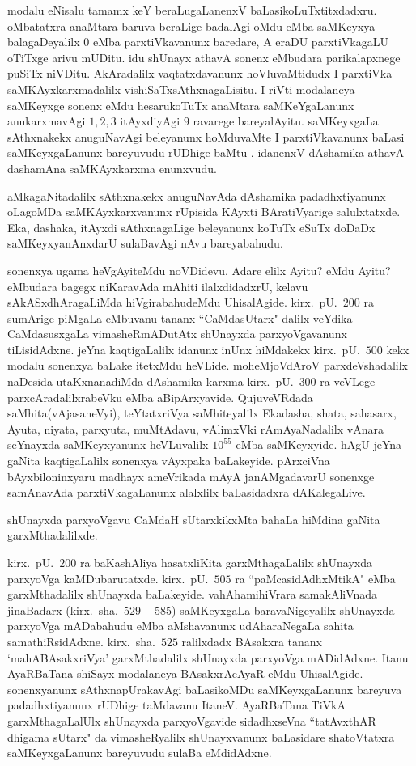modalu eNisalu tamamx keY beraLugaLanenxV baLasikoLuTxtitxdadxru. oMbatatxra anaMtara baruva beraLige badalAgi oMdu eMba saMKeyxya balagaDeyalilx $0$ eMba parxtiVkavanunx baredare, A eraDU parxtiVkagaLU oTiTxge arivu mUDitu. idu shUnayx athavA sonenx eMbudara parikalapxnege puSiTx niVDitu. AkAradalilx vaqtatxdavanunx hoVluvaMtidudx I parxtiVka saMKAyxkarxmadalilx vishiSaTxsAthxnagaLisitu. I riVti modalaneya saMKeyxge sonenx eMdu hesarukoTuTx anaMtara saMKeYgaLanunx anukarxmavAgi $1,2,3$ itAyxdi\-yAgi $9$ ravarege bareyalAyitu. saMKeyxgaLa sAthxnakekx anuguNavAgi beleyanunx hoMdu\-vaMte I parxtiVkavanunx baLasi saMKeyxgaLanunx bareyuvudu rUDhige baMtu . idanenxV dAshamika athavA dashamAna saMKAyxkarxma enunxvudu.

aMkagaNitadalilx sAthxnakekx anuguNavAda dAshamika padadhxtiyanunx oLagoMDa saMKAyx\-karxvanunx rUpisida KAyxti BAratiVyarige salulxtatxde. Eka, dashaka, itAyxdi sAthxnagaLige bele\-yanunx koTuTx eSuTx doDaDx saMKeyxyanAnxdarU sulaBavAgi nAvu bareyabahudu.

sonenxya ugama heVgAyiteMdu noVDidevu. Adare elilx Ayitu? eMdu Ayitu? eMbudara bagegx niKaravAda mAhiti ilalxdidadxrU, kelavu sAkASxdhAragaLiMda hiVgirabahudeMdu UhisalAgide. kirx.~pU.\ $200$ ra sumArige piMgaLa eMbuvanu tananx ``CaMdasUtarx" dalilx veYdika CaMdasusxgaLa vimasheRmADutAtx shUnayxda parxyoVgavanunx tiLisidAdxne. jeYna kaqtigaLalilx idanunx inUnx hiMdakekx kirx.~pU.\ $500$ kekx modalu sonenxya baLake itetxMdu heVLide. moheMjoVdAroV parxdeVshadalilx naDesida utaKxnanadiMda dAshamika karxma kirx.~pU.\ $300$ ra veVLege parxcAradalilxrabeVku eMba aBipArxyavide. QujuveVRdada saMhita(vAjasaneVyi), teYtatxriVya saMhiteyalilx Ekadasha, shata, sahasarx, Ayuta, niyata, parxyuta, muMtAdavu, vAlimxVki rAmAyaNadalilx vAnara seYnayxda saMKeyxyanunx heVLuvalilx $10^{55}$ eMba saMKeyxyide. hAgU jeYna gaNita kaqtigaLalilx sonenxya vAyxpaka baLakeyide. pArxciVna bAyxbiloninxyaru madhayx ameVrikada mAyA janAMgadavarU sonenxge samAnavAda parxtiVkagaLanunx alalxlilx baLasidadxra dAKalegaLive. 

shUnayxda parxyoVgavu CaMdaH sUtarxkikxMta bahaLa hiMdina gaNita garxMthadalilxde.

kirx.~pU.\ $200$ ra baKashAliya hasatxliKita garxMthagaLalilx shUnayxda parxyoVga kaMDu\-barutatxde. kirx.~pU.\ $505$ ra ``paMcasidAdhxMtikA" eMba garxMthadalilx shUnayxda baLakeyide. vahAha\-mihiVrara samakAliVnada jinaBadarx (kirx.~sha.\ $529-585$) saMKeyxgaLa baravaNige\-yalilx shUnayxda parxyoVga mADabahudu eMba aMshavanunx udAharaNegaLa sahita samathiRsidAdxne. kirx.~sha.\ $525$ ralilxdadx BAsakxra tananx `mahABAsakxriVya' garxMthadalilx shUnayxda parxyoVga mADidAdxne. Itanu AyaRBaTana shiSayx modalaneya BAsakxrAcAyaR eMdu UhisalAgide. sonenxyanunx sAthxnapUrakavAgi baLasikoMDu saMKeyxgaLanunx bareyuva padadhxtiyanunx rUDhige taMdavanu ItaneV. AyaRBaTana TiVkA garxMthagaLalUlx shUnayxda parxyoVgavide sidadhxseVna ``tatAvxthAR dhigama sUtarx" da vimasheRyalilx shUnayx\-vanunx baLasidare shatoVtatxra saMKeyxgaLanunx bareyuvudu sulaBa eMdidAdxne.

